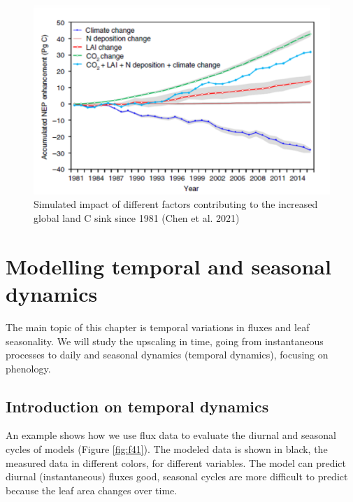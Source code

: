\documentclass[12pt,oneside]{book}
\begin{document}
\begin{figure}

{\centering \includegraphics[width=0.8\linewidth]{figures/chap3/f335_chen2} 

}

\caption{Simulated impact of different factors contributing to the increased global land C sink since 1981 (Chen et al. 2021) }\label{fig:f335}
\end{figure}

\chapter{Modelling temporal and seasonal
dynamics}\label{modelling-temporal-and-seasonal-dynamics}


The main topic of this chapter is temporal variations in fluxes and leaf
seasonality. We will study the upscaling in time, going from
instantaneous processes to daily and seasonal dynamics (temporal
dynamics), focusing on phenology.

\section{Introduction on temporal
dynamics}\label{introduction-on-temporal-dynamics}

An example shows how we use flux data to evaluate the diurnal and
seasonal cycles of models (Figure \ref{fig:f41}). The modeled data is
shown in black, the measured data in different colors, for different
variables. The model can predict diurnal (instantaneous) fluxes good,
seasonal cycles are more difficult to predict because the leaf area
changes over time.
\end{document}
